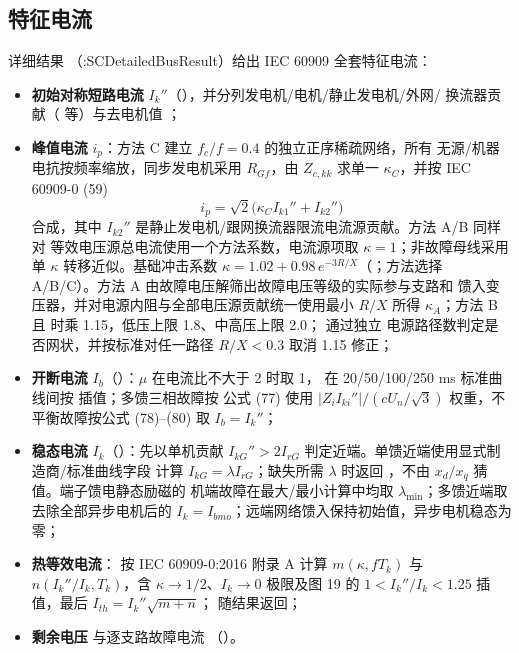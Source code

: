 \subsection{特征电流}
详细结果 （:SCDetailedBusResult）给出 IEC 60909 全套特征电流：
\begin{itemize}
  \item \textbf{初始对称短路电流} $I_k''$（），并分列发电机/电机/静止发电机/外网/
        换流器贡献（ 等）与去电机值 ；
  \item \textbf{峰值电流} $i_p$：方法 C 建立 $f_c/f=0.4$ 的独立正序稀疏网络，所有
        无源/机器电抗按频率缩放，同步发电机采用 $R_{Gf}$，由 $Z_{c,kk}$ 求单一
        $\kappa_C$，并按 IEC 60909-0 (59)
        \begin{equation}
        i_p=\sqrt2\bigl(\kappa_C I_{k1}''+I_{k2}''\bigr)
        \end{equation}
        合成，其中 $I_{k2}''$ 是静止发电机/跟网换流器限流电流源贡献。方法 A/B 同样对
        等效电压源总电流使用一个方法系数，电流源项取 $\kappa=1$；非故障母线采用单
        $\kappa$ 转移近似。基础冲击系数
        $\kappa=1.02+0.98\,e^{-3R/X}$（；方法选择
         A/B/C）。方法 A 由故障电压解筛出故障电压等级的实际参与支路和
        馈入变压器，并对电源内阻与全部电压源贡献统一使用最小 $R/X$ 所得 $\kappa_A$；方法 B
        且  时乘 1.15，低压上限 1.8、中高压上限 2.0； 通过独立
        电源路径数判定是否网状，并按标准对任一路径 $R/X<0.3$ 取消 1.15 修正；
  \item \textbf{开断电流} $I_b$（）：$\mu$ 在电流比不大于 2 时取 1，
        在 20/50/100/250 ms 标准曲线间按  插值；多馈三相故障按
        公式 (77) 使用 $|Z_iI_{ki}''|/(cU_n/\sqrt3)$ 权重，不平衡故障按公式 (78)--(80)
        取 $I_b=I_k''$；
  \item \textbf{稳态电流} $I_k$（）：先以单机贡献
        $I_{kG}''>2I_{rG}$ 判定近端。单馈近端使用显式制造商/标准曲线字段
         计算 $I_{kG}=\lambda I_{rG}$；缺失所需
        $\lambda$ 时返回 ，不由 $x_d/x_q$ 猜值。端子馈电静态励磁的
        机端故障在最大/最小计算中均取 $\lambda_{\min}$；多馈近端取去除全部异步电机后的
        $I_k=I_{bmo}$；远端网络馈入保持初始值，异步电机稳态为零；
  \item \textbf{热等效电流}： 按 IEC 60909-0:2016
        附录 A 计算 $m(\kappa,fT_k)$ 与 $n(I_k''/I_k,T_k)$，含 $\kappa\to1/2$、$I_k\to0$
        极限及图 19 的 $1< I_k''/I_k <1.25$ 插值，最后
        $I_{th}=I_k''\sqrt{m+n}$； 随结果返回；
  \item \textbf{剩余电压}  与逐支路故障电流 （）。
\end{itemize}

